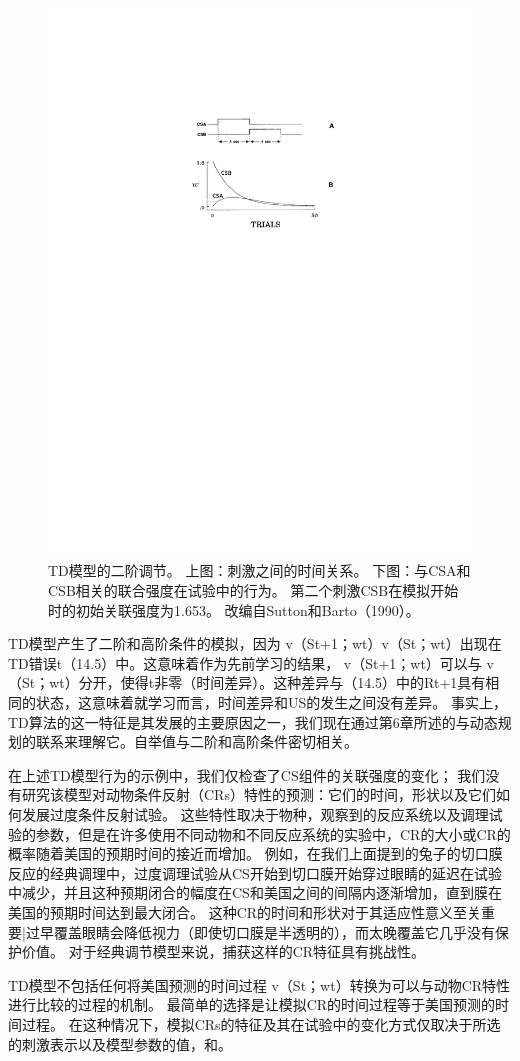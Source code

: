 {{{{{{{{{{{{{{{{{{{{\begin{figure}[!htb]
	\centering
	\includegraphics[width=0.5\linewidth]{chap11/fig_11_5}
	\caption{TD模型的二阶调节。
		上图：刺激之间的时间关系。
		下图：与CSA和CSB相关的联合强度在试验中的行为。
		第二个刺激CSB在模拟开始时的初始关联强度为1.653。
		改编自Sutton和Barto（1990）。 \label{fig:11_5}}
\end{figure}


TD模型产生了二阶和高阶条件的模拟，因为 v（St+1；wt）v（St；wt）出现在TD错误t（14.5）中。这意味着作为先前学习的结果， v（St+1；wt）可以与 v（St；wt）分开，使得t非零（时间差异）。这种差异与（14.5）中的Rt+1具有相同的状态，这意味着就学习而言，时间差异和US的发生之间没有差异。
事实上，TD算法的这一特征是其发展的主要原因之一，我们现在通过第6章所述的与动态规划的联系来理解它。自举值与二阶和高阶条件密切相关。


在上述TD模型行为的示例中，我们仅检查了CS组件的关联强度的变化；
我们没有研究该模型对动物条件反射（CRs）特性的预测：它们的时间，形状以及它们如何发展过度条件反射试验。
这些特性取决于物种，观察到的反应系统以及调理试验的参数，但是在许多使用不同动物和不同反应系统的实验中，CR的大小或CR的概率随着美国的预期时间的接近而增加。
例如，在我们上面提到的兔子的切口膜反应的经典调理中，过度调理试验从CS开始到切口膜开始穿过眼睛的延迟在试验中减少，并且这种预期闭合的幅度在CS和美国之间的间隔内逐渐增加，直到膜在美国的预期时间达到最大闭合。
这种CR的时间和形状对于其适应性意义至关重要|过早覆盖眼睛会降低视力（即使切口膜是半透明的），而太晚覆盖它几乎没有保护价值。
对于经典调节模型来说，捕获这样的CR特征具有挑战性。


TD模型不包括任何将美国预测的时间过程 v（St；wt）转换为可以与动物CR特性进行比较的过程的机制。
最简单的选择是让模拟CR的时间过程等于美国预测的时间过程。
在这种情况下，模拟CRs的特征及其在试验中的变化方式仅取决于所选的刺激表示以及模型参数的值，和。


}}}}}}}}}}}}}}}}}}}}
